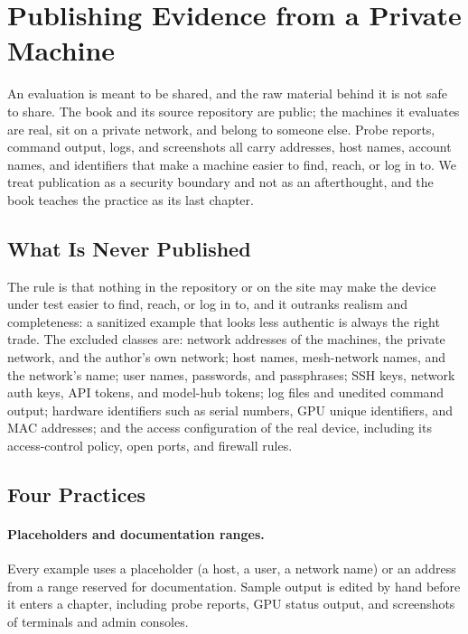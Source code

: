 \documentclass[11pt]{article}
\begin{document}
\section{Publishing Evidence from a Private Machine}
\label{sec:publishing}

An evaluation is meant to be shared, and the raw material behind it is not safe to share. The book and its source repository are public; the machines it evaluates are real, sit on a private network, and belong to someone else. Probe reports, command output, logs, and screenshots all carry addresses, host names, account names, and identifiers that make a machine easier to find, reach, or log in to. We treat publication as a security boundary and not as an afterthought, and the book teaches the practice as its last chapter.

\subsection{What Is Never Published}

The rule is that nothing in the repository or on the site may make the device under test easier to find, reach, or log in to, and it outranks realism and completeness: a sanitized example that looks less authentic is always the right trade. The excluded classes are: network addresses of the machines, the private network, and the author's own network; host names, mesh-network names, and the network's name; user names, passwords, and passphrases; SSH keys, network auth keys, API tokens, and model-hub tokens; log files and unedited command output; hardware identifiers such as serial numbers, GPU unique identifiers, and MAC addresses; and the access configuration of the real device, including its access-control policy, open ports, and firewall rules.

\subsection{Four Practices}

\paragraph{Placeholders and documentation ranges.}
Every example uses a placeholder (a host, a user, a network name) or an address from a range reserved for documentation. Sample output is edited by hand before it enters a chapter, including probe reports, GPU status output, and screenshots of terminals and admin consoles.
\end{document}
